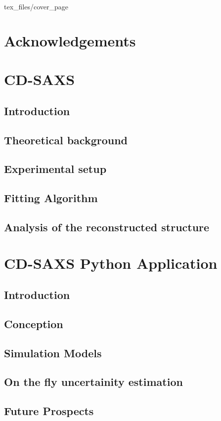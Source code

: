 \documentclass[12pt]{article}
\begin{document}
 {tex_files/cover_page}

\newpage
\section*{Acknowledgements}

\medskip


\newpage

\tableofcontents







\section{CD-SAXS}
\subsection{Introduction}
\subsection{Theoretical background}
\subsection{Experimental setup}
\subsection{Fitting Algorithm}
\subsection{Analysis of the reconstructed structure}

\section{CD-SAXS Python Application}
\subsection{Introduction}
\subsection{Conception}
\subsection{Simulation Models}
\subsection{On the fly uncertainity estimation}
\subsection{Future Prospects}

\newpage

\printbibliography
\end{document}
